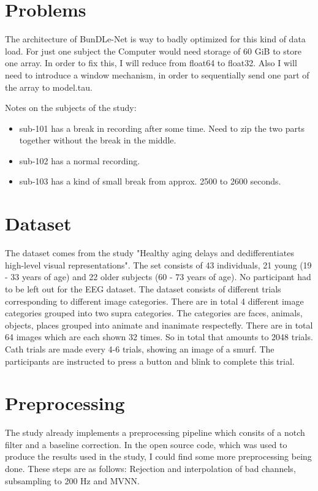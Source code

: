 \documentclass{article}
\begin{document}
\section{Problems}
The architecture of BunDLe-Net is way to badly optimized for this kind of data load. For just one subject the Computer would need storage of 60 GiB to store one array. 
In order to fix this, I will reduce from float64 to float32. Also I will need to introduce a window mechanism, in order to sequentially send one part of the array to model.tau. 

Notes on the subjects of the study: 
\begin{itemize}
    \item sub-101 has a break in recording after some time. Need to zip the two parts together without the break in the middle.
    \item sub-102 has a normal recording. 
    \item sub-103 has a kind of small break from approx. 2500 to 2600 seconds. 
    
    
\end{itemize}

\section{Dataset}
The dataset comes from the study "Healthy aging delays and dedifferentiates high-level
visual representations". The set consists of 43 individuals, 21 young (19 - 33 years of age)
and 22 older subjects (60 - 73 years of age). No participant had to be left out for the EEG dataset.
The dataset consists of different trials corresponding to different image categories. 
There are in total 4 different image categories grouped into two supra categories. 
The categories are faces, animals, objects, places grouped into animate and inanimate respectefly. 
There are in total 64 images which are each shown 32 times. So in total that amounts to 2048 trials. 
Cath trials are made every 4-6 trials, showing an image of a smurf. The participants are instructed to 
press a button and blink to complete this trial. 

\section{Preprocessing}
The study already implements a preprocessing pipeline which consits of a notch filter and a baseline
correction. 
In the open source code, which was used to produce the results used in the study, I could find some more 
preprocessing being done. These steps are as follows: Rejection and interpolation of bad channels, subsampling
to 200 Hz and MVNN.
\end{document}
